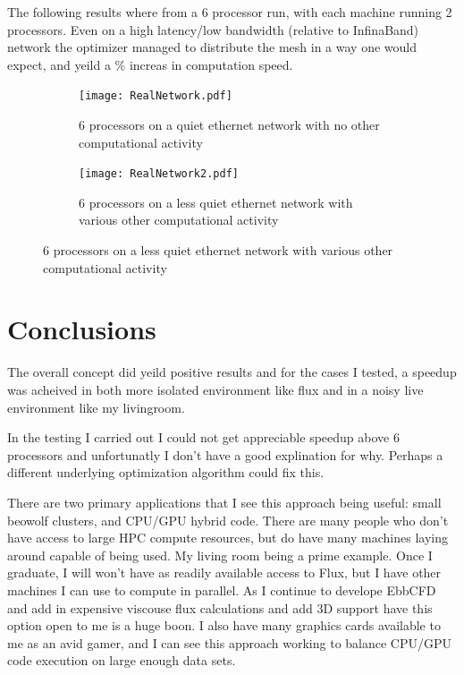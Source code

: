 \documentclass[12pt,parskip=full]{article}
\numberwithin{subsection}{section}
\begin{document}
		The following results where from a 6 processor run, with each machine running 2 processors. Even on a high latency/low bandwidth (relative to 
		InfinaBand) network the optimizer managed to distribute the mesh in a way one would expect, and yeild a \% increas in computation speed.
		\begin{figure}[H]
			\centering
			\begin{subfigure}[H]{0.9\textwidth}
				\texttt{[image: RealNetwork.pdf]}
				\caption{6 processors on a quiet ethernet network with no other computational activity}
			\end{subfigure}
			\begin{subfigure}[H]{0.9\textwidth}
				\texttt{[image: RealNetwork2.pdf]}
				\caption{6 processors on a less quiet ethernet network with various other computational activity}
			\end{subfigure}
		\end{figure}



	\section{Conclusions}

		The overall concept did yeild positive results and for the cases I tested, a speedup was acheived in both more isolated environment like flux
		and in a noisy live environment like my livingroom. 

		In the testing I carried out I could not get appreciable speedup above 6 processors and unfortunatly I don't have a good explination for why.
		Perhaps a different underlying optimization algorithm could fix this. 
		
		There are two primary applications that I see this approach being useful: small beowolf clusters, and CPU/GPU hybrid code. There are many people
		who don't have access to large HPC compute resources, but do have many machines laying around capable of being used. My living room being a prime
		example. Once I graduate, I will won't have as readily available access to Flux, but I have other machines I can use to compute in parallel. As I
		continue to develope EbbCFD and add in expensive viscouse flux calculations and add 3D support have this option open to me is a huge boon. I also
		have many graphics cards available to me as an avid gamer, and I can see this approach working to balance CPU/GPU code execution on large enough
		data sets.
\end{document}
